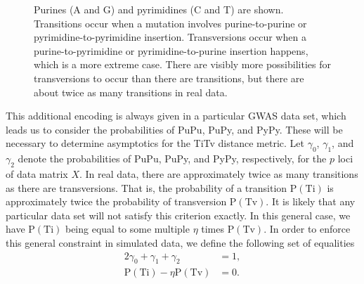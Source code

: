 \documentclass[aoas]{imsart}
\begin{document}
\begin{figure}[H]
\begin{minipage}[c]{0.62\textwidth}
\end{minipage}\hfill
\begin{minipage}[c]{0.34\textwidth}
	\caption{Purines (A and G) and pyrimidines (C and T) are shown. Transitions occur when a mutation involves purine-to-purine or pyrimidine-to-pyrimidine insertion. Transversions occur when a purine-to-pyrimidine or pyrimidine-to-purine insertion happens, which is a more extreme case. There are visibly more possibilities for transversions to occur than there are transitions, but there are about twice as many transitions in real data.}\label{fig:TiTv_diagram}
\end{minipage}
\end{figure}

This additional encoding is always given in a particular GWAS data set, which leads us to consider the probabilities of PuPu, PuPy, and PyPy. These will be necessary to determine asymptotics for the TiTv distance metric. Let $\gamma_0$, $\gamma_1$, and $\gamma_2$ denote the probabilities of PuPu, PuPy, and PyPy, respectively, for the $p$ loci of data matrix $X$. In real data, there are approximately twice as many transitions as there are transversions. That is, the probability of a transition $\text{P}(\text{Ti})$ is approximately twice the probability of transversion $\text{P}(\text{Tv})$. It is likely that any particular data set will not satisfy this criterion exactly. In this general case, we have $\text{P}(\text{Ti})$ being equal to some multiple $\eta$ times $\text{P}(\text{Tv})$. In order to enforce this general constraint in simulated data, we define the following set of equalities
%
\begin{alignat}{2}\label{eq:TiTv_constraints1}
\gamma_0 + \gamma_1 + \gamma_2 &= 1, \\ \label{eq:TiTv_constraints2}
\text{P}(\text{Ti}) - \eta \text{P}(\text{Tv}) &= 0.
\end{alignat}
\end{document}
